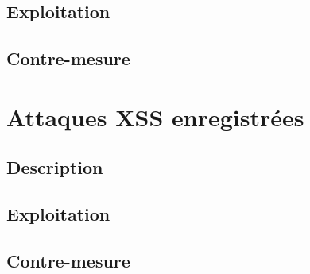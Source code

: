 \subsection{Exploitation}

\subsection{Contre-mesure}


\section{Attaques XSS enregistrées }

\subsection{Description}

\subsection{Exploitation}

\subsection{Contre-mesure}


















